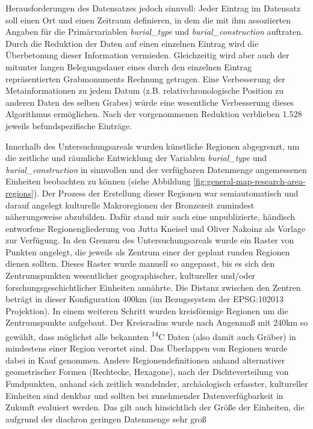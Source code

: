 \documentclass[openany,twoside,twocolumn]{book}
\begin{document}
Herausforderungen des Datensatzes jedoch sinnvoll: Jeder Eintrag im
Datensatz soll einen Ort und einen Zeitraum definieren, in dem die mit
ihm assoziierten Angaben für die Primärvariablen \emph{burial\_type} und
\emph{burial\_construction} auftraten. Durch die Reduktion der Daten auf
einen einzelnen Eintrag wird die Überbetonung dieser Information
vermieden. Gleichzeitig wird aber auch der mitunter langen
Belegungsdauer eines durch den einzelnen Eintrag repräsentierten
Grabmonuments Rechnung getragen. Eine Verbesserung der Metainformationen
zu jedem Datum (z.B. relativchronologische Position zu anderen Daten des
selben Grabes) würde eine wesentliche Verbesserung dieses Algorithmus
ermöglichen. Nach der vorgenommenen Reduktion verblieben 1.528 jeweils
befundspezifische Einträge.

Innerhalb des Untersuchungsareals wurden künstliche Regionen abgegrenzt,
um die zeitliche und räumliche Entwicklung der Variablen
\emph{burial\_type} und \emph{burial\_construction} in sinnvollen und
der verfügbaren Datenmenge angemessenen Einheiten beobachten zu können
(siehe Abbildung \ref{fig:general-map-research-area-regions}). Der
Prozess der Erstellung dieser Regionen war semiautomatisch und darauf
angelegt kulturelle Makroregionen der Bronzezeit zumindest
näherungsweise abzubilden. Dafür stand mir auch eine unpublizierte,
händisch entworfene Regionengliederung von Jutta Kneisel und Oliver
Nakoinz als Vorlage zur Verfügung. In den Grenzen des
Untersuchungsareals wurde ein Raster von Punkten angelegt, die jeweils
als Zentrum einer der geplant runden Regionen dienen sollten. Dieses
Raster wurde manuell so angepasst, bis es sich den Zentrumspunkten
wesentlicher geographischer, kultureller und/oder
forschungsgeschichtlicher Einheiten annährte. Die Distanz zwischen den
Zentren beträgt in dieser Konfiguration 400km (im Bezugssystem der
EPSG:102013 Projektion). In einem weiteren Schritt wurden kreisförmige
Regionen um die Zentrumspunkte aufgebaut. Der Kreisradius wurde nach
Augenmaß mit 240km so gewählt, dass möglichst alle bekannten
\textsuperscript{14}C Daten (also damit auch Gräber) in mindestens einer
Region verortet sind. Das Überlappen von Regionen wurde dabei in Kauf
genommen. Andere Regionendefinitionen anhand alternativer geometrischer
Formen (Rechtecke, Hexagone), nach der Dichteverteilung von Fundpunkten,
anhand sich zeitlich wandelnder, archäologisch erfasster, kultureller
Einheiten sind denkbar und sollten bei zunehmender Datenverfügbarkeit in
Zukunft evaluiert werden. Das gilt auch hinsichtlich der Größe der
Einheiten, die aufgrund der diachron geringen Datenmenge sehr groß
\end{document}
